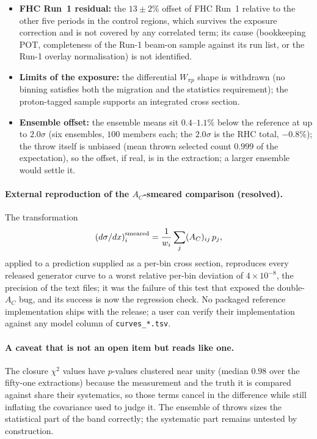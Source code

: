 \begin{itemize}
    beam-on data shows a residual organised in $p_\mu$ (data over prediction $1.16$--$1.82$ at
    $0.35$--$0.75$~GeV/$c$) in both modes and in regions of different composition; open.
  \item \textbf{FHC Run~1 residual:} the $13\pm2\%$ offset of FHC Run~1 relative to the other five
    periods in the control regions, which survives the exposure correction and is not covered by any
    correlated term; its cause (bookkeeping POT, completeness of the Run-1 beam-on sample against its
    run list, or the Run-1 overlay normalisation) is not identified.
  \item \textbf{Limits of the exposure:} the differential $W_{\pi p}$ shape is withdrawn
    (no binning satisfies both the migration and the statistics requirement); the
    proton-tagged sample supports an integrated cross section.
  \item \textbf{Ensemble offset:} the ensemble means sit $0.4$--$1.1\%$ below the reference
    at up to $2.0\sigma$ (six ensembles, $100$ members each; the $2.0\sigma$ is the RHC total, $-0.8\%$); the throw itself is unbiased (mean thrown
    selected count $0.999$ of the expectation), so the offset, if real, is in the
    extraction; a larger ensemble would settle it.
\end{itemize}

\paragraph{External reproduction of the $A_C$-smeared comparison (resolved).}
The transformation
\[
  \left(d\sigma/dx\right)^{\rm smeared}_i = \frac{1}{w_i}\sum_j (A_C)_{ij}\,p_j ,
\]
applied to a prediction supplied as a per-bin cross section, reproduces every released
generator curve to a worst relative per-bin deviation of $4\times10^{-8}$, the precision of the
text files; it was the failure of
this test that exposed the double-$A_C$ bug, and its success is now the regression check.
No packaged reference implementation ships with the release; a user can verify their
implementation against any model column of \texttt{curves\_*.tsv}.

\paragraph{A caveat that is not an open item but reads like one.}
The closure $\chi^2$ values have $p$-values clustered near unity (median $0.98$ over the
fifty-one extractions) because the measurement and the truth it is compared against share
their systematics, so those terms cancel in the difference while still inflating the
covariance used to judge it. The ensemble of throws sizes the statistical part of the
band correctly; the systematic part remains untested by construction.


